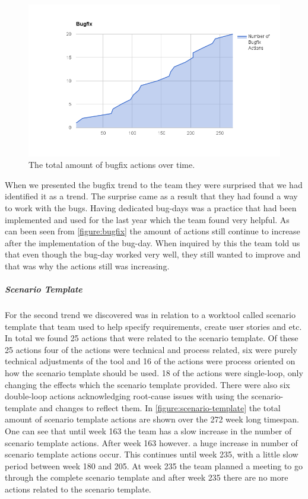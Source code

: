 \begin{figure}[!h]
	\centering
	\includegraphics[width=\textwidth, keepaspectratio]{figures/bugfix.png}
	\caption{The total amount of bugfix actions over time.}
	\label{figure:bugfix}
\end{figure}

When we presented the bugfix trend to the team they were surprised that we had identified it as a trend. The surprise came as a result that they had found a way to work with the bugs. Having dedicated bug-days was a practice that had been implemented and used for the last year which the team found very helpful. As can been seen from \autoref{figure:bugfix} the amount of actions still continue to increase after the implementation of the bug-day. When inquired by this the team told us that even though the bug-day worked very well, they still wanted to improve and that was why the actions still was increasing. 

\subparagraph{Scenario Template}\label{results-ca-scenario-template}
For the second trend we discovered was in relation to a worktool called scenario template that team used to help specify requirements, create user stories and etc. In total we found 25 actions that were related to the scenario template. Of these 25 actions four of the actions were technical and process related, six were purely technical adjustments of the tool and 16 of the actions were process oriented on how the scenario template should be used. 18 of the actions were single-loop, only changing the effects which the scenario template provided. There were also six double-loop actions acknowledging root-cause issues with using the scenario-template and changes to reflect them. 
In \autoref{figure:scenario-template} the total amount of scenario template actions are shown over the 272 week long timespan. One can see that until week 163 the team has a slow increase in the number of scenario template actions. After week 163 however. a huge increase in number of scenario template actions occur. This continues until week 235, with a little slow period between week 180 and 205. At week 235 the team planned a meeting to go through the complete scenario template and after week 235 there are no more actions related to the scenario template. 

